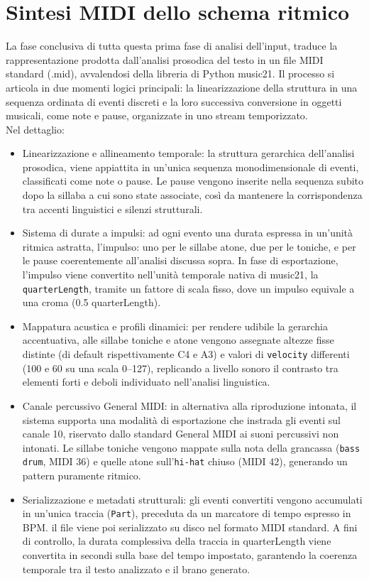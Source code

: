 \section{Sintesi MIDI dello schema ritmico}
La fase conclusiva di tutta questa prima fase di analisi dell'input, traduce la rappresentazione prodotta dall'analisi prosodica del testo in un file 
MIDI standard (.mid), avvalendosi della libreria di Python music21. Il processo si articola in due momenti 
logici principali: la linearizzazione della struttura in una sequenza ordinata di eventi discreti e la loro successiva conversione in oggetti musicali, 
come note e pause, organizzate in uno stream temporizzato.\\
Nel dettaglio:
\begin{itemize}
      \item Linearizzazione e allineamento temporale: la struttura gerarchica dell'analisi prosodica, viene appiattita in un'unica sequenza monodimensionale 
      di eventi, classificati come note o pause. Le pause vengono inserite nella sequenza subito dopo la sillaba a cui sono state associate, così da 
      mantenere la corrispondenza tra accenti linguistici e silenzi strutturali.
      \item Sistema di durate a impulsi: ad ogni evento  una durata espressa in un'unità ritmica astratta, l'impulso: uno per le sillabe atone, due per 
      le toniche, e per le pause coerentemente all'analisi discussa sopra. In fase di esportazione, l'impulso viene convertito nell'unità temporale nativa 
      di music21, la \texttt{quarterLength}, tramite un fattore di scala fisso, dove un impulso equivale a una croma 
      (0.5 quarterLength).
      \item Mappatura acustica e profili dinamici: per rendere udibile la gerarchia accentuativa, alle sillabe toniche e atone vengono assegnate altezze 
      fisse distinte (di default rispettivamente C4 e A3) e valori di \texttt{velocity} differenti (100 e 60 su una scala 0–127), replicando a livello 
      sonoro il contrasto tra elementi forti e deboli individuato nell'analisi linguistica.
      \item Canale percussivo General MIDI: in alternativa alla riproduzione intonata, il sistema supporta una modalità di esportazione che instrada 
      gli eventi sul canale 10, riservato dallo standard General MIDI ai suoni percussivi non intonati. Le sillabe toniche vengono mappate sulla nota 
      della grancassa (\texttt{bass drum}, MIDI 36) e quelle atone sull'\texttt{hi-hat} chiuso (MIDI 42), generando un pattern puramente ritmico.
      \item Serializzazione e metadati strutturali: gli eventi convertiti vengono accumulati in un'unica traccia (\texttt{Part}), preceduta da un 
      marcatore di tempo espresso in BPM. il file viene poi serializzato su disco nel formato MIDI standard. A fini di controllo, la durata complessiva 
      della traccia in quarterLength viene convertita in secondi sulla base del tempo impostato, garantendo la coerenza temporale tra il testo analizzato 
      e il brano generato.
\end{itemize}
